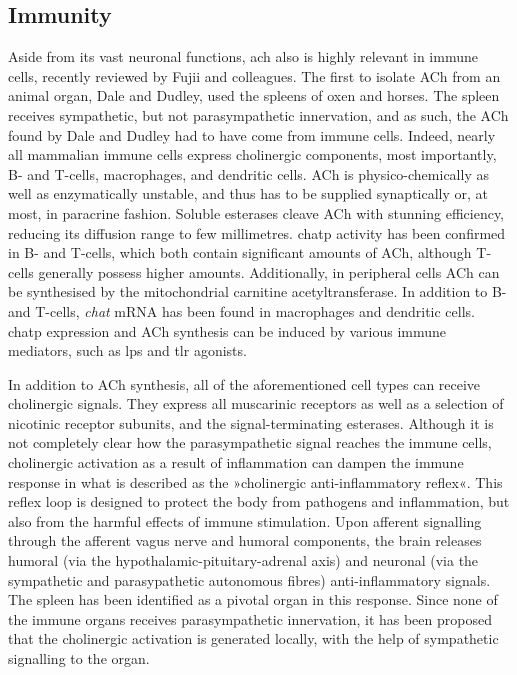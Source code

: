 \subsection{Immunity} \label{sec:intro:immunity}
Aside from its vast neuronal functions, \ac{ach} also is highly relevant in immune cells, recently reviewed by Fujii and colleagues.\cite{Fujii2017} The first to isolate ACh from an animal organ, Dale and Dudley,\cite{Dale1929} used the spleens of oxen and horses. The spleen receives sympathetic, but not parasympathetic innervation, and as such, the ACh found by Dale and Dudley had to have come from immune cells. Indeed, nearly all mammalian immune cells express cholinergic components, most importantly, B- and T-cells, macrophages, and dendritic cells. ACh is physico-chemically as well as enzymatically unstable, and thus has to be supplied synaptically or, at most, in paracrine fashion. Soluble esterases cleave ACh with stunning efficiency, reducing its diffusion range to few millimetres. \Ac{chatp} activity has been confirmed in B- and T-cells, which both contain significant amounts of ACh, although T-cells generally possess higher amounts. Additionally, in peripheral cells ACh can be synthesised by the mitochondrial carnitine acetyltransferase. In addition to B- and T-cells, \emph{\acs{chat}} mRNA has been found in macrophages and dendritic cells. \ac{chatp} expression and ACh synthesis can be induced by various immune mediators, such as \ac{lps} and \ac{tlr} agonists.

In addition to ACh synthesis, all of the aforementioned cell types can receive cholinergic signals. They express all muscarinic receptors as well as a selection of nicotinic receptor subunits, and the signal-terminating esterases. Although it is not completely clear how the parasympathetic signal reaches the immune cells, cholinergic activation as a result of inflammation can dampen the immune response in what is described as the »cholinergic anti-inflammatory reflex«.\cite{Pavlov2017} This reflex loop is designed to protect the body from pathogens and inflammation, but also from the harmful effects of immune stimulation. Upon afferent signalling through the afferent vagus nerve and humoral components, the brain releases humoral (via the hypothalamic-pituitary-adrenal axis) and neuronal (via the sympathetic and parasypathetic autonomous fibres) anti-inflammatory signals. The spleen has been identified as a pivotal organ in this response. Since none of the immune organs receives parasympathetic innervation, it has been proposed that the cholinergic activation is generated locally, with the help of sympathetic signalling to the organ.\cite{Dantzer2018}

